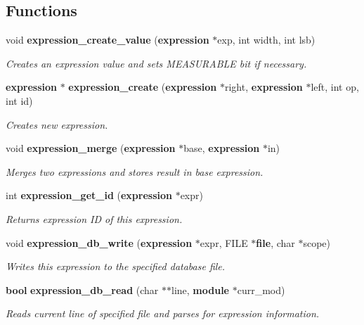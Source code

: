 \subsection*{Functions}
\begin{CompactItemize}
\item 
void {\bf expression\_\-create\_\-value} ({\bf expression} $\ast$exp, int width, int lsb)
\begin{CompactList}\small\item\em Creates an expression value and sets MEASURABLE bit if necessary.\item\end{CompactList}\item 
{\bf expression} $\ast$ {\bf expression\_\-create} ({\bf expression} $\ast$right, {\bf expression} $\ast$left, int op, int id)
\begin{CompactList}\small\item\em Creates new expression.\item\end{CompactList}\item 
void {\bf expression\_\-merge} ({\bf expression} $\ast$base, {\bf expression} $\ast$in)
\begin{CompactList}\small\item\em Merges two expressions and stores result in base expression.\item\end{CompactList}\item 
int {\bf expression\_\-get\_\-id} ({\bf expression} $\ast$expr)
\begin{CompactList}\small\item\em Returns expression ID of this expression.\item\end{CompactList}\item 
void {\bf expression\_\-db\_\-write} ({\bf expression} $\ast$expr, FILE $\ast${\bf file}, char $\ast$scope)
\begin{CompactList}\small\item\em Writes this expression to the specified database file.\item\end{CompactList}\item 
{\bf bool} {\bf expression\_\-db\_\-read} (char $\ast$$\ast$line, {\bf module} $\ast$curr\_\-mod)
\begin{CompactList}\small\item\em Reads current line of specified file and parses for expression information.\item\end{CompactList}\item 
$$
\end{CompactItemize}

